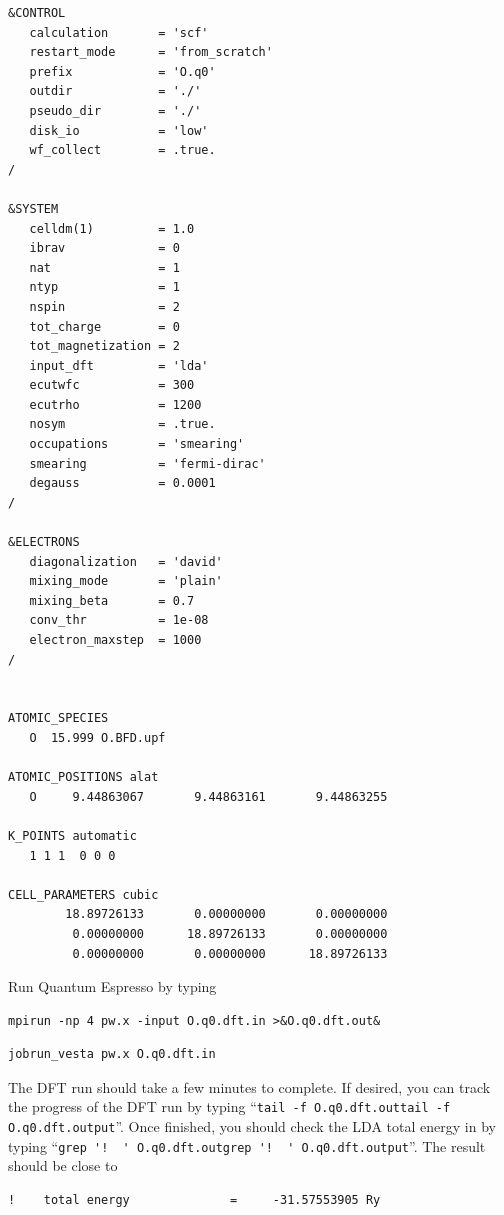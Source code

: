 \begin{lstlisting}[caption={Quantum Espresso input file for the neutral oxygen atom (\texttt{O.q0.dft.in})\label{lst:O_q0_dft}}]
&CONTROL
   calculation       = 'scf'
   restart_mode      = 'from_scratch'
   prefix            = 'O.q0'
   outdir            = './'
   pseudo_dir        = './'
   disk_io           = 'low'
   wf_collect        = .true.
/

&SYSTEM
   celldm(1)         = 1.0
   ibrav             = 0
   nat               = 1
   ntyp              = 1
   nspin             = 2
   tot_charge        = 0
   tot_magnetization = 2
   input_dft         = 'lda'
   ecutwfc           = 300
   ecutrho           = 1200
   nosym             = .true.
   occupations       = 'smearing'
   smearing          = 'fermi-dirac'
   degauss           = 0.0001
/

&ELECTRONS
   diagonalization   = 'david'
   mixing_mode       = 'plain'
   mixing_beta       = 0.7
   conv_thr          = 1e-08
   electron_maxstep  = 1000
/


ATOMIC_SPECIES 
   O  15.999 O.BFD.upf

ATOMIC_POSITIONS alat
   O     9.44863067       9.44863161       9.44863255

K_POINTS automatic
   1 1 1  0 0 0 

CELL_PARAMETERS cubic
        18.89726133       0.00000000       0.00000000 
         0.00000000      18.89726133       0.00000000 
         0.00000000       0.00000000      18.89726133
\end{lstlisting}

Run Quantum Espresso by typing 
\ifws
\begin{shaded}
\begin{verbatim}
mpirun -np 4 pw.x -input O.q0.dft.in >&O.q0.dft.out&
\end{verbatim}
\end{shaded}
\else
\begin{shaded}
\begin{verbatim}
jobrun_vesta pw.x O.q0.dft.in
\end{verbatim} 
\end{shaded}
\fi

The DFT run should take a few minutes to complete.  If desired, you can track the progress of the DFT run by typing ``\ifws\verb|tail -f O.q0.dft.out|\else\verb|tail -f O.q0.dft.output|\fi''. Once finished, you should check the LDA total energy in \texttt{} by typing ``\ifws\verb|grep '!  ' O.q0.dft.out|\else\verb|grep '!  ' O.q0.dft.output|\fi''.  The result should be close to
\begin{shaded}
\begin{verbatim}
!    total energy              =     -31.57553905 Ry
\end{verbatim}
\end{shaded} 



